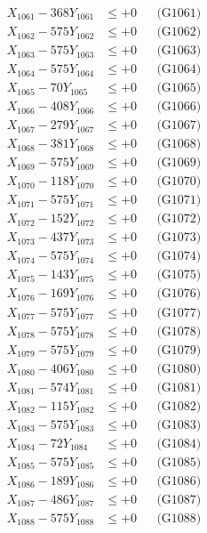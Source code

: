 \documentclass[a4paper,10pt]{article}
\begin{document}
{\begin{align}
\allowbreak
X_{1061} - 368Y_{1061} &\leq +0 && \text{(G1061)} \\
X_{1062} - 575Y_{1062} &\leq +0 && \text{(G1062)} \\
X_{1063} - 575Y_{1063} &\leq +0 && \text{(G1063)} \\
X_{1064} - 575Y_{1064} &\leq +0 && \text{(G1064)} \\
X_{1065} - 70Y_{1065} &\leq +0 && \text{(G1065)} \\
X_{1066} - 408Y_{1066} &\leq +0 && \text{(G1066)} \\
X_{1067} - 279Y_{1067} &\leq +0 && \text{(G1067)} \\
X_{1068} - 381Y_{1068} &\leq +0 && \text{(G1068)} \\
X_{1069} - 575Y_{1069} &\leq +0 && \text{(G1069)} \\
X_{1070} - 118Y_{1070} &\leq +0 && \text{(G1070)} \\
\allowbreak
X_{1071} - 575Y_{1071} &\leq +0 && \text{(G1071)} \\
X_{1072} - 152Y_{1072} &\leq +0 && \text{(G1072)} \\
X_{1073} - 437Y_{1073} &\leq +0 && \text{(G1073)} \\
X_{1074} - 575Y_{1074} &\leq +0 && \text{(G1074)} \\
X_{1075} - 143Y_{1075} &\leq +0 && \text{(G1075)} \\
X_{1076} - 169Y_{1076} &\leq +0 && \text{(G1076)} \\
X_{1077} - 575Y_{1077} &\leq +0 && \text{(G1077)} \\
X_{1078} - 575Y_{1078} &\leq +0 && \text{(G1078)} \\
X_{1079} - 575Y_{1079} &\leq +0 && \text{(G1079)} \\
X_{1080} - 406Y_{1080} &\leq +0 && \text{(G1080)} \\
\allowbreak
X_{1081} - 574Y_{1081} &\leq +0 && \text{(G1081)} \\
X_{1082} - 115Y_{1082} &\leq +0 && \text{(G1082)} \\
X_{1083} - 575Y_{1083} &\leq +0 && \text{(G1083)} \\
X_{1084} - 72Y_{1084} &\leq +0 && \text{(G1084)} \\
X_{1085} - 575Y_{1085} &\leq +0 && \text{(G1085)} \\
X_{1086} - 189Y_{1086} &\leq +0 && \text{(G1086)} \\
X_{1087} - 486Y_{1087} &\leq +0 && \text{(G1087)} \\
X_{1088} - 575Y_{1088} &\leq +0 && \text{(G1088)} \\

\end{align}}
\end{document}
